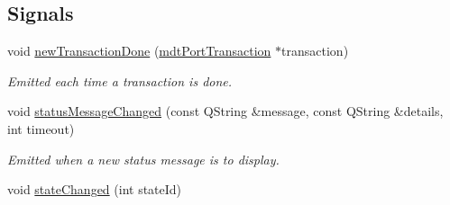 \subsection*{Signals}
\begin{DoxyCompactItemize}
\item 
void \hyperlink{classmdt_port_manager_a416a24db1048e9f66aef27ea810954d2}{newTransactionDone} (\hyperlink{classmdt_port_transaction}{mdtPortTransaction} $\ast$transaction)
\begin{DoxyCompactList}\small\item\em Emitted each time a transaction is done. \end{DoxyCompactList}\item 
void \hyperlink{classmdt_port_manager_a6f6c6f8a8430d8631a08c765565db9ab}{statusMessageChanged} (const QString \&message, const QString \&details, int timeout)
\begin{DoxyCompactList}\small\item\em Emitted when a new status message is to display. \end{DoxyCompactList}\item 
\hypertarget{classmdt_port_manager_a01da0634bc52a71c0df0d83fc166eeda}{
void \hyperlink{classmdt_port_manager_a01da0634bc52a71c0df0d83fc166eeda}{stateChanged} (int stateId)}
\label{classmdt_port_manager_a01da0634bc52a71c0df0d83fc166eeda}


\end{DoxyCompactItemize}
